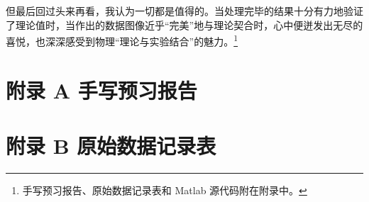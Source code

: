 \documentclass[UTF8]{article}
\theoremstyle{MyLineTheoremStyle} %
\theoremstyle{MyBlockTheoremStyle} %
\theoremstyle{MySubsubsectionStyle} %
\begin{document}
但最后回过头来再看，我认为一切都是值得的。当处理完毕的结果十分有力地验证了理论值时，当作出的数据图像近乎“完美”地与理论契合时，心中便迸发出无尽的喜悦，也深深感受到物理“理论与实验结合”的魅力。\footnote{手写预习报告、原始数据记录表和 Matlab 源代码附在附录中。}






\newpage
\appendix
\titleformat{\section}[hang]{\normalfont\huge\bfseries\centering}{}{20pt}{}
\titlespacing*{\section}{0pt}{-25pt}{8pt} %
\titleformat{\subsection}[hang]{\normalfont\Large\bfseries\boldmath}{\thesubsection}{8pt}{}
\titleformat{\subsection}[hang]{\normalfont\normalsize\bfseries\boldmath}{\thesubsection}{8pt}{}


\section*{附录 A\hspace*{20pt} 手写预习报告}
\thispagestyle{fancy} 

\begin{figure}[H]\centering
    
\end{figure}



\section*{附录 B\hspace*{20pt} 原始数据记录表}
\thispagestyle{fancy} 
\end{document}
